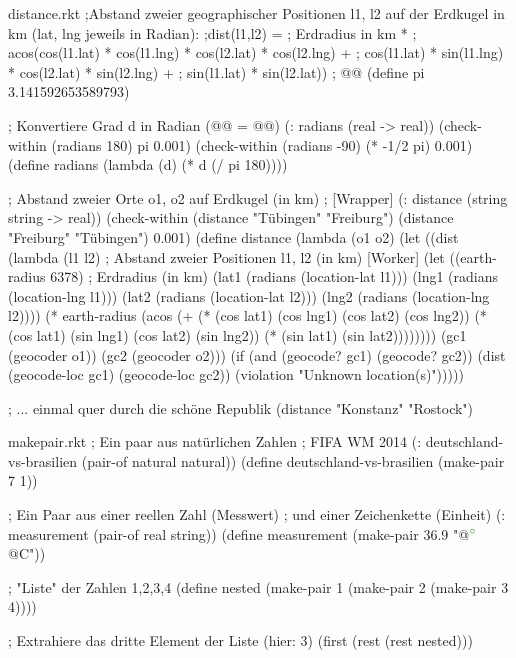 \begin{filecontents*}{distance.rkt}
;Abstand zweier geographischer Positionen l1, l2 auf der Erdkugel in km (lat, lng jeweils in Radian):
;dist(l1,l2) =
;   Erdradius in km *
;   acos(cos(l1.lat) * cos(l1.lng) * cos(l2.lat) * cos(l2.lng) + 
;        cos(l1.lat) * sin(l1.lng) * cos(l2.lat) * sin(l2.lng) +
;        sin(l1.lat) * sin(l2.lat))
; @\latexcode{$\pi$}@
(define pi 3.141592653589793)

; Konvertiere Grad d in Radian (@\latexcode{$\pi$}@ = @@)
(: radians (real -> real))
(check-within (radians 180) pi 0.001)
(check-within (radians -90) (* -1/2 pi) 0.001)
(define radians
  (lambda (d)
    (* d (/ pi 180))))


; Abstand zweier Orte o1, o2 auf Erdkugel (in km)
; [Wrapper]
(: distance (string string -> real))
(check-within (distance "Tübingen" "Freiburg") (distance "Freiburg" "Tübingen") 0.001)
(define distance
  (lambda (o1 o2)
    (let ((dist (lambda (l1 l2)             ; Abstand zweier Positionen l1, l2 (in km)  [Worker]
                  (let ((earth-radius 6378) ; Erdradius (in km)                  
                        (lat1 (radians (location-lat l1)))
                        (lng1 (radians (location-lng l1)))
                        (lat2 (radians (location-lat l2)))
                        (lng2 (radians (location-lng l2))))
                    (* earth-radius
                       (acos (+ (* (cos lat1) (cos lng1) (cos lat2) (cos lng2))
                                (* (cos lat1) (sin lng1) (cos lat2) (sin lng2))
                                (* (sin lat1) (sin lat2))))))))
          (gc1 (geocoder o1))
          (gc2 (geocoder o2)))
      (if (and (geocode? gc1)
               (geocode? gc2))
          (dist (geocode-loc gc1) (geocode-loc gc2))
          (violation "Unknown location(s)")))))

; ... einmal quer durch die schöne Republik
(distance "Konstanz" "Rostock")
\end{filecontents*}
\begin{filecontents*}{makepair.rkt}
; Ein paar aus natürlichen Zahlen
; FIFA WM 2014
(: deutschland-vs-brasilien (pair-of natural natural))
(define deutschland-vs-brasilien
  (make-pair 7 1)) 

; Ein Paar aus einer reellen Zahl (Messwert) 
; und einer Zeichenkette (Einheit)
(: measurement (pair-of real string))
(define measurement
  (make-pair 36.9 "@$^{\textcolor{string}{\circ}}$@C"))


; "Liste" der Zahlen 1,2,3,4
(define nested
  (make-pair 1
             (make-pair 2
                        (make-pair 3
                                   4))))

; Extrahiere das dritte Element der Liste (hier: 3)
(first (rest (rest nested)))
\end{filecontents*}
